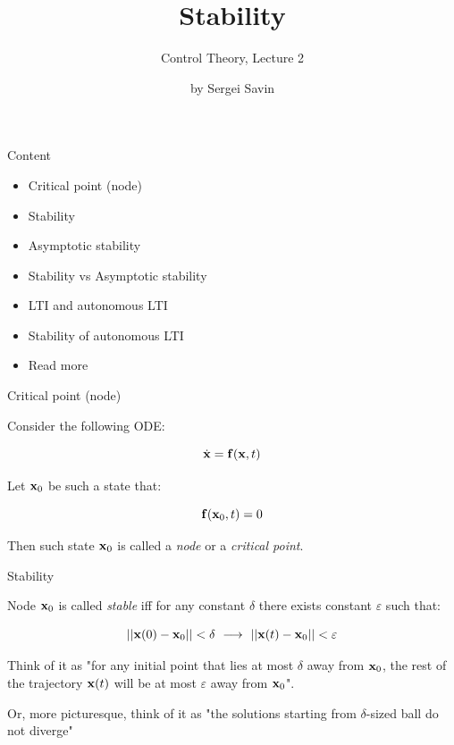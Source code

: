 \documentclass{beamer}
\title{Stability}
\subtitle{Control Theory, Lecture 2}
\author{by Sergei Savin}
\date{\mydate}
\begin{document}
\maketitle


\begin{frame}{Content}

\begin{itemize}
\item Critical point (node)
\item Stability
\item Asymptotic stability
\item Stability vs Asymptotic stability
\item LTI and autonomous LTI
\item Stability of autonomous LTI
\item Read more
\end{itemize}

\end{frame}



\begin{frame}{Critical point (node)}
\begin{flushleft}

Consider the following ODE:

\begin{equation}
    \dot{\mathbf{x}} = \mathbf{f} (\mathbf{x}, t)
\end{equation}

Let $\mathbf{x}_0$ be such a state that:

\begin{equation}
    \mathbf{f} (\mathbf{x}_0, t) = 0
\end{equation}

Then such state $\mathbf{x}_0$ is called a \emph{node} or a \emph{critical point}.

\end{flushleft}
\end{frame}



\begin{frame}{Stability}
\begin{flushleft}

Node $\mathbf{x}_0$ is called \emph{stable} iff for any constant $\delta$ there exists constant $\varepsilon$ such that:

\begin{equation}
    ||\bo{x}(0) - \bo{x}_0|| < \delta \ \longrightarrow \ ||\bo{x}(t) - \bo{x}_0|| < \varepsilon
\end{equation}

\bigskip

Think of it as "for any initial point that lies at most $\delta$ away from $\mathbf{x}_0$, the rest of the trajectory $\mathbf{x}(t)$ will be at most $\varepsilon$ away from $\mathbf{x}_0$".

\bigskip

Or, more picturesque, think of it as "the solutions starting from $\delta$-sized ball do not diverge"

\end{flushleft}
\end{frame}
\end{document}
